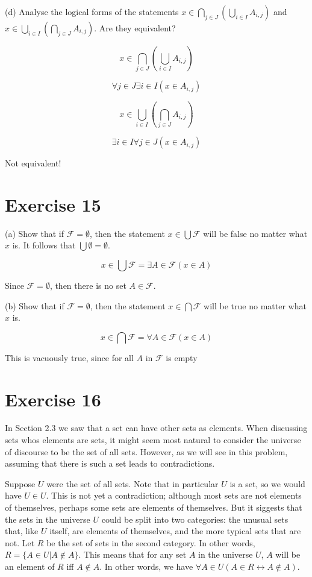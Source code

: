 \documentclass[11pt]{article}
\newcommand{\bicond}{\leftrightarrow}
\newcommand{\family}{\mathcal{F}}
\begin{document}
\noindent (d) Analyse the logical forms of the statements 
$x \in \bigcap_{j \in J} (\bigcup_{i \in I} A_{i, j})$ and 
$x \in \bigcup_{i \in I} (\bigcap_{j \in J} A_{i, j})$. Are they equivalent?

$$x \in \bigcap_{j \in J} (\bigcup_{i \in I} A_{i, j})$$

$$\forall j \in J \exists i \in I (x \in A_{i, j})$$

$$x \in \bigcup_{i \in I} (\bigcap_{j \in J} A_{i, j})$$

$$\exists i \in I \forall j \in J (x \in A_{i, j})$$

Not equivalent!

\section*{Exercise 15}

\noindent (a) Show that if $\family = \emptyset$, then the statement 
$x \in \bigcup \family$ will be false no matter what $x$ is. It follows that 
$\bigcup \emptyset = \emptyset$.

$$x \in \bigcup \family = \exists A \in \family (x \in A)$$

Since $\family = \emptyset$, then there is no set $A \in \family$.

\noindent (b) Show that if $\family = \emptyset$, then the statement 
$x \in \bigcap \family$ will be true no matter what $x$ is.

$$x \in \bigcap \family = \forall A \in \family (x \in A)$$

This is vacuously true, since for all $A$ in $\family$ is empty

\section*{Exercise 16} In Section 2.3 we saw that a set can have other sets as 
elements. When discussing sets whos elements are sets, it might seem most 
natural to consider the universe of discourse to be the set of all sets. 
However, as we will see in this problem, assuming that there is such a set leads 
to contradictions.

Suppose $U$ were the set of all sets. Note that in particular $U$ is a set, so 
we would have $U \in U$. This is not yet a contradiction; although most sets are
not elements of themselves, perhaps some sets are elements of themselves. 
But it siggests that the sets in the universe $U$ could be split into two 
categories: the unusual sets that, like $U$ itself, are elements of themselves, 
and the more typical sets that are not. Let $R$ be the set of sets in the second 
category. In other words, $R = \{A \in U | A \notin A\}$. This means that for 
any set $A$ in the universe $U$, $A$ will be an element of $R$ iff $A \notin A$.
In other words, we have $\forall A \in U (A \in R \bicond A \notin A)$.
\end{document}

